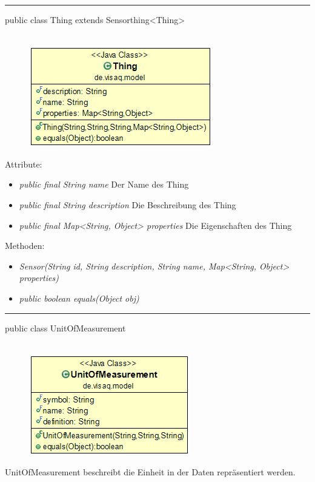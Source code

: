 \rule{\textwidth}{0.4pt}
public class Thing extends Sensorthing<Thing>
\\\\
\begin{minipage}{0.3\textwidth}
	\begin{figure}[H]
		\includegraphics[scale = 0.5
		]{media/frontend/model/ThingClass.png}
	\end{figure}
\end{minipage} \hfill
\begin{minipage}{0.6\textwidth}
\end{minipage}

Attribute:
\begin{itemize} 
	\item \emph{public final String name} Der Name des Thing
	\item \emph{public final String description} Die Beschreibung des Thing
	\item \emph{public final Map<String, Object> properties} Die Eigenschaften des Thing
\end{itemize}
Methoden:
\begin{itemize} 
	\item \emph{Sensor(String id, String description, String name, Map<String, Object> properties)} 
	\item \emph{public boolean equals(Object obj)} 
\end{itemize}

\rule{\textwidth}{0.4pt}
public class UnitOfMeasurement 
\\\\
\begin{minipage}{0.3\textwidth}
	\begin{figure}[H]
		\includegraphics[scale = 0.5
		]{media/frontend/model/UnitOfMeasurementClass.png} 
	\end{figure}
\end{minipage} \hfill
\begin{minipage}{0.6\textwidth}
	 UnitOfMeasurement beschreibt die Einheit in der Daten repräsentiert werden.
\end{minipage}

